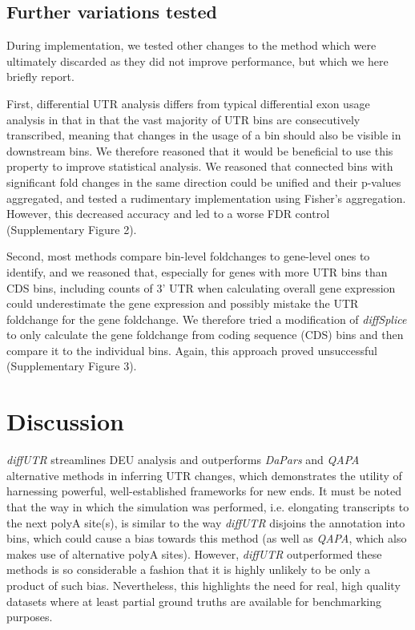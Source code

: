 \documentclass{bmcart}
\begin{document}
\subsection*{Further variations tested}

During implementation, we tested other changes to the method which were ultimately discarded as they did not improve performance, but which we here briefly report.

First, differential UTR analysis differs from typical differential exon usage analysis in that in that the vast majority of UTR bins are consecutively transcribed, meaning that changes in the usage of a bin should also be visible in downstream bins. We therefore reasoned that it would be beneficial to use this property to improve statistical analysis. We reasoned that connected bins with significant fold changes in the same direction could be unified and their p-values aggregated, and tested a rudimentary implementation using Fisher's aggregation. However, this decreased accuracy and led to a worse FDR control (Supplementary Figure 2).

Second, most methods compare bin-level foldchanges to gene-level ones to identify, and we reasoned that, especially for genes with more UTR bins than CDS bins, including counts of 3' UTR when calculating overall gene expression could underestimate the gene expression and possibly mistake the UTR foldchange for the gene foldchange. We therefore tried a modification of \textit{diffSplice} to only calculate the gene foldchange from coding sequence (CDS) bins and then compare it to the individual bins. Again, this approach proved unsuccessful (Supplementary Figure 3).

\section*{Discussion}

\textit{diffUTR} streamlines DEU analysis and outperforms \textit{DaPars} and \textit{QAPA} alternative methods in inferring UTR changes, which demonstrates the utility of harnessing powerful, well-established frameworks for new ends. It must be noted that the way in which the simulation was performed, i.e. elongating transcripts to the next polyA site(s), is similar to the way \textit{diffUTR} disjoins the annotation into bins, which could cause a bias towards this method (as well as \textit{QAPA}, which also makes use of alternative polyA sites). However, \textit{diffUTR} outperformed these methods is so considerable a fashion that it is highly unlikely to be only a product of such bias. Nevertheless, this highlights the need for real, high quality datasets where at least partial ground truths are available for benchmarking purposes.
\end{document}
